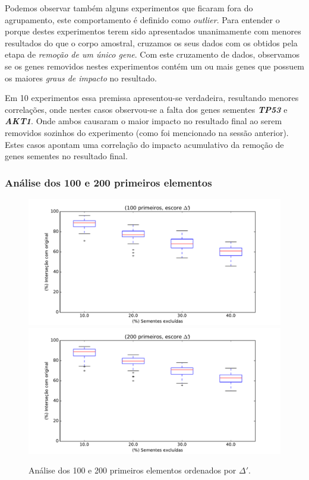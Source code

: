 Podemos observar também alguns experimentos que ficaram fora do agrupamento, este comportamento é definido como \textit{outlier}. Para entender o porque destes experimentos terem sido apresentados unanimamente com menores resultados do que o corpo amostral, cruzamos os seus dados com os obtidos pela etapa de \textit{remoção de um único gene}. Com este cruzamento de dados, observamos se os genes removidos nestes experimentos contém um ou mais genes que possuem os maiores \textsl{\textsl{graus de impacto}} no resultado.
%

Em 10 experimentos essa premissa apresentou-se verdadeira, resultando menores correlações, onde nestes casos observou-se a falta dos genes sementes \textbf{\textsl{TP53}} e \textbf{\textsl{AKT1}}. Onde ambos causaram o maior impacto no resultado final ao serem removidos sozinhos do experimento (como foi mencionado na sessão anterior). Estes casos apontam uma correlação do impacto acumulativo da remoção de genes sementes no resultado final.
%
%
%
\subsubsection{Análise dos 100 e 200 primeiros elementos}
%
\begin{figure}[ht!]
\includegraphics[width=1\textwidth]{Images/analyses/fig_S_100_40.pdf}
\includegraphics[width=1\textwidth]{Images/analyses/fig_S_200_40.pdf}
\caption {Análise dos 100 e 200 primeiros elementos ordenados por $\Delta'$.
\label{fig_S_100-200_40}}
\end{figure}
%

